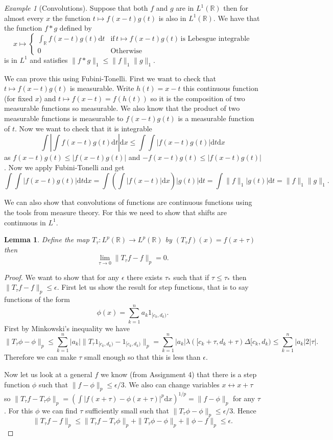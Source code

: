 \documentclass[11pt]{article}
\newtheorem{lem}[thm]{Lemma}
\theoremstyle{definition}
\theoremstyle{remark}
\newtheorem{ex}[thm]{Example}
\begin{document}
\begin{ex}[Convolutions]
Suppose that both $f$ and $g$ are in $L^1(\mathbb{R})$ then for almost every $x$ the function $ t \mapsto f(x-t) g(t)$ is also in $L^1(\mathbb{R})$. We have that the function $f*g$ defined by
\[ x \mapsto \left\{ \begin{array}{ll} \int_\mathbb{R} f(x-t)g(t) \mathrm{d}t & \mbox{if}\, t \mapsto f(x-t)g(t)\, \mbox{is Lebesgue integrable} \\
0 & \mbox{Otherwise} \end{array}\right. \] is in $L^1$ and satisfies $\|f*g\|_1 \leq \|f\|_1 \|g\|_1$.

We can prove this using Fubini-Tonelli. First we want to check that $t \mapsto f(x-t)g(t)$ is measurable. Write $h(t) = x-t$ this continuous function (for fixed $x$) and $t \mapsto f(x-t) = f(h(t))$ so it is the composition of two measurable functions so measurable. We also know that the product of two measurable functions is measurable to $f(x-t)g(t)$ is a measurable function of $t$. Now we want to check that it is integrable
\[ \int \left| \int f(x-t)g(t) \mathrm{d}t \right| \mathrm{d}x \leq \int \int |f(x-t)g(t)| \mathrm{d}t \mathrm{d}x \] as $f(x-t)g(t) \leq |f(x-t)g(t)|$ and $-f(x-t)g(t) \leq |f(x-t)g(t)|$. Now we apply Fubini-Tonelli and get
\[ \int \int |f(x-t)g(t)| \mathrm{d}t \mathrm{d}x = \int \left( \int |f(x-t)| \mathrm{d}x\right) |g(t)| \mathrm{d}t = \int \|f\|_1 |g(t)| \mathrm{d}t = \|f\|_1 \|g\|_1. \]
\end{ex}

We can also show that convolutions of functions are continuous functions using the tools from measure theory. For this we need to show that shifts are continuous in $L^1$.
\begin{lem}
Define the map $T_\tau: L^p(\mathbb{R}) \rightarrow L^p(\mathbb{R})$ by $(T_\tau f)(x) = f(x+ \tau)$ then 
\[ \lim_{\tau \rightarrow 0}\|T_\tau f - f\|_p = 0. \]
\end{lem}
\begin{proof}
We want to show that for any $\epsilon$ there exists $\tau_*$ such that if $\tau \leq \tau_*$ then $\|T_\tau f-f\|_p \leq \epsilon$. First let us show the result for step functions, that is to say functions of the form
\[ \phi(x) = \sum_{k=1}^n a_k 1_{[c_k, d_k)}.\] First by Minkowski's inequality we have
\[ \| T_\tau \phi - \phi\|_p \leq \sum_{k=1}^n |a_k| \| T_\tau 1_{[c_k, d_k)} - 1_{[c_k, d_k)}\|_p  = \sum_{k=1}^n |a_k| \lambda ([c_k + \tau, d_k + \tau) \Delta [c_k, d_k) \leq \sum_{k=1}^n |a_k| 2|\tau|.\] Therefore we can make $\tau$ small enough so that this is less than $\epsilon$. 

Now let us look at a general $f$ we know (from Assignment 4) that there is a step function $\phi$ such that $\|f-\phi\|_p \leq \epsilon/3$. We also can change variables $x \leftrightarrow x+\tau$ so $\|T_\tau f - T_\tau \phi\|_p = \left( \int |f(x+\tau) - \phi(x+\tau)|^p \mathrm{d}x\right)^{1/p} = \|f-\phi\|_p$ for any $\tau$. For this $\phi$ we can find $\tau$ sufficiently small such that $\|T_\tau \phi - \phi\|_p \leq \epsilon/3$. Hence
\[ \|T_\tau f - f\|_p  \leq \|T_\tau f - T_\tau \phi\|_p + \| T_\tau \phi - \phi\|_p + \| \phi - f\|_p \leq \epsilon. \]
\end{proof}
\end{document}
